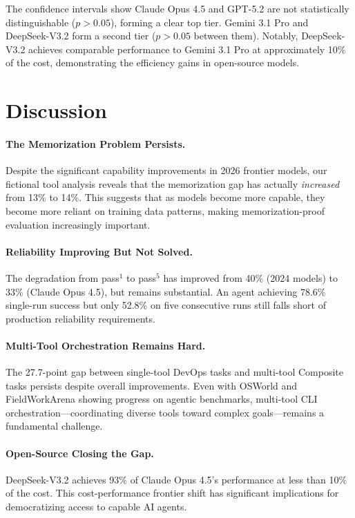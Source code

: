 \documentclass{article}
\begin{document}
The confidence intervals show Claude Opus 4.5 and GPT-5.2 are not statistically distinguishable ($p > 0.05$), forming a clear top tier. Gemini 3.1 Pro and DeepSeek-V3.2 form a second tier ($p > 0.05$ between them). Notably, DeepSeek-V3.2 achieves comparable performance to Gemini 3.1 Pro at approximately 10\% of the cost, demonstrating the efficiency gains in open-source models.

\section{Discussion}
\label{sec:discussion}

\paragraph{The Memorization Problem Persists.} Despite the significant capability improvements in 2026 frontier models, our fictional tool analysis reveals that the memorization gap has actually \emph{increased} from 13\% to 14\%. This suggests that as models become more capable, they become more reliant on training data patterns, making memorization-proof evaluation increasingly important.

\paragraph{Reliability Improving But Not Solved.} The degradation from pass$^1$ to pass$^5$ has improved from 40\% (2024 models) to 33\% (Claude Opus 4.5), but remains substantial. An agent achieving 78.6\% single-run success but only 52.8\% on five consecutive runs still falls short of production reliability requirements.

\paragraph{Multi-Tool Orchestration Remains Hard.} The 27.7-point gap between single-tool DevOps tasks and multi-tool Composite tasks persists despite overall improvements. Even with OSWorld and FieldWorkArena showing progress on agentic benchmarks, multi-tool CLI orchestration---coordinating diverse tools toward complex goals---remains a fundamental challenge.

\paragraph{Open-Source Closing the Gap.} DeepSeek-V3.2 achieves 93\% of Claude Opus 4.5's performance at less than 10\% of the cost. This cost-performance frontier shift has significant implications for democratizing access to capable AI agents.
\end{document}
